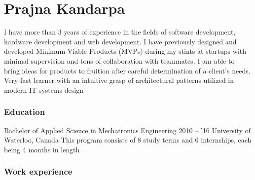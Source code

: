 \documentclass{tccv}
\begin{document}
\part{Prajna Kandarpa}
I have more than 3 years of experience in the fields of software development,
hardware development and web development. I have previously designed and
developed Minimum Viable Products (MVPs) during my stints at startups with
minimal supervision and tons of collaboration with teammates. I am able to bring
ideas for products to fruition after careful determination of a client's needs.
Very fast learner with an intuitive grasp of architectural patterns utilized in
modern IT systems design

\section{Education}

\begin{yearlist}

\item[Bachelor of Applied Science in Mechatronics Engineering]{2010 -- '16}
  {University of Waterloo, Canada}
  {This program consists of 8 study terms and 6 internships, each being 4 months
    in length}
\end{yearlist}
\section{Work experience}
\end{document}
